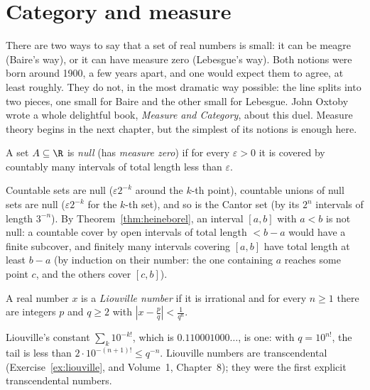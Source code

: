 \section{Category and measure}\label{sec:categorymeasure}

There are two ways to say that a set of real numbers is small: it can be meagre (Baire's way), or it can have measure zero
(Lebesgue's way). Both notions were born around 1900, a few years apart, and one would expect them to agree, at least
roughly. They do not, in the most dramatic way possible: the line splits into two pieces, one small for Baire and the other
small for Lebesgue. John Oxtoby wrote a whole delightful book, \emph{Measure and Category}, about this duel.
Measure theory begins in the next chapter, but the simplest of its notions is enough here.

\begin{definition}
A set $A\subseteq\R$ is \emph{null} (has \emph{measure zero}) if for every $\varepsilon>0$ it is covered by countably many intervals of total length less than $\varepsilon$.
\end{definition}

Countable sets are null ($\varepsilon2^{-k}$ around the $k$-th point), countable unions of null sets are null ($\varepsilon2^{-k}$ for the $k$-th set), and so is the
Cantor set (by its $2^n$ intervals of length $3^{-n}$). By Theorem~\ref{thm:heineborel}, an interval $[a,b]$ with $a<b$ is not null: a countable cover by open intervals
of total length $<b-a$ would have a finite subcover, and finitely many intervals covering $[a,b]$ have total length at least $b-a$ (by induction on their
number: the one containing $a$ reaches some point $c$, and the others cover $[c,b]$).

\begin{definition}
A real number $x$ is a \emph{Liouville number} if it is irrational and for every $n\ge1$ there are integers $p$ and $q\ge2$ with $|x-\frac pq|<\frac1{q^n}$.
\end{definition}

Liouville's constant $\sum_k10^{-k!}$, which is $0.110001000\ldots$, is one: with $q=10^{n!}$, the tail is less than $2\cdot10^{-(n+1)!}\le q^{-n}$. Liouville numbers are transcendental
(Exercise~\ref{ex:liouville}, and Volume~1, Chapter~8); they were the first explicit transcendental numbers.

